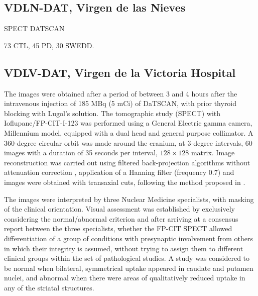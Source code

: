 \subsection{VDLN-DAT, Virgen de las Nieves}\label{sec:vdlndat}
\ac{SPECT} DATSCAN


73 \ac{CTL}, 45 \ac{PD}, 30 \ac{SWEDD}. 

\subsection{VDLV-DAT, Virgen de la Victoria Hospital}\label{sec:vdlvdat}
The images were obtained after a period of between 3 and 4 hours after the intravenous injection of 185 MBq (5 mCi) of DaTSCAN, with prior thyroid blocking with Lugol's solution. The tomographic study (\ac{SPECT}) with Ioflupane/FP-CIT-I-123 was performed using a General Electric gamma camera, Millennium model, equipped with a dual head and general purpose collimator. A 360-degree circular orbit was made around the cranium, at 3-degree intervals, 60 images with a duration of 35 seconds per interval, $128\times128$ matrix. Image reconstruction was carried out using filtered back-projection algorithms without attenuation correction \cite{Shepp82,Vardi1985}, application of a Hanning filter (frequency 0.7) and images were obtained with transaxial cuts, following the method proposed in \cite{Ramirez2009}. 

The images were interpreted by three Nuclear Medicine specialists, with masking of the clinical orientation. Visual assessment was established by exclusively considering the normal/abnormal criterion and after arriving at a consensus report between the three specialists, \ie whether the FP-CIT \ac{SPECT} allowed differentiation of a group of conditions with presynaptic involvement from others in which their integrity is assumed, without trying to assign them to different clinical groups within the set of pathological studies. A study was considered to be normal when bilateral, symmetrical uptake appeared in caudate and putamen nuclei, and abnormal when there were areas of qualitatively reduced uptake in any of the striatal structures. 


